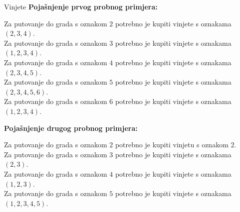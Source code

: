 \begin{statement}[
  problempoints=100,
  timelimit=1 sekunda,
  memorylimit=512 MiB,
]{Vinjete}
\textbf{Pojašnjenje prvog probnog primjera:}

Za putovanje do grada s oznakom $2$ potrebno je kupiti vinjete s oznakama $(2, 3, 4)$.\\
Za putovanje do grada s oznakom $3$ potrebno je kupiti vinjete s oznakama $(1, 2, 3, 4)$.\\
Za putovanje do grada s oznakom $4$ potrebno je kupiti vinjete s oznakama $(2, 3, 4, 5)$.\\
Za putovanje do grada s oznakom $5$ potrebno je kupiti vinjete s oznakama $(2, 3, 4, 5, 6)$.\\
Za putovanje do grada s oznakom $6$ potrebno je kupiti vinjete s oznakama $(1, 2, 3, 4)$.

\textbf{Pojašnjenje drugog probnog primjera:}

Za putovanje do grada s oznakom $2$ potrebno je kupiti vinjetu s oznakom $2$.\\
Za putovanje do grada s oznakom $3$ potrebno je kupiti vinjete s oznakama $(2, 3)$.\\
Za putovanje do grada s oznakom $4$ potrebno je kupiti vinjete s oznakama $(1, 2, 3)$.\\
Za putovanje do grada s oznakom $5$ potrebno je kupiti vinjete s oznakama $(1, 2, 3, 4, 5)$.
\end{statement}

